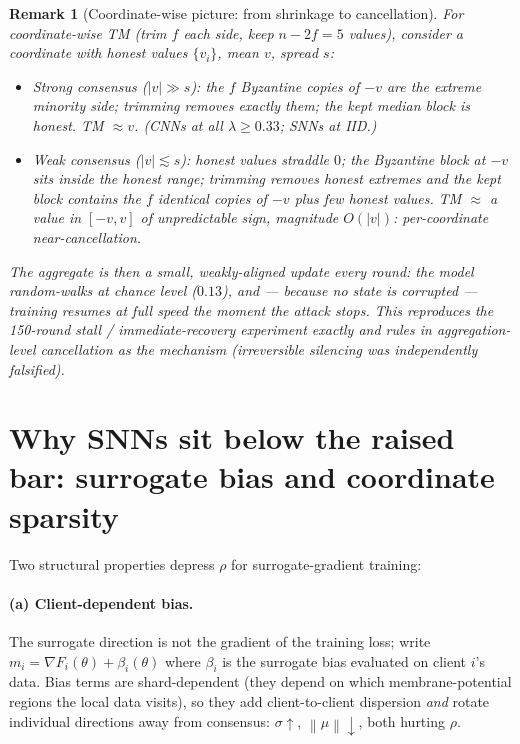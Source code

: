 \documentclass[11pt]{article}
\newtheorem{remark}{Remark}
\newcommand{\norm}[1]{\left\lVert #1 \right\rVert}
\begin{document}
\begin{remark}[Coordinate-wise picture: from shrinkage to cancellation]
For coordinate-wise TM (trim $f$ each side, keep $n-2f = 5$ values), consider a
coordinate with honest values $\{v_i\}$, mean $v$, spread $s$:
\begin{itemize}[leftmargin=2em, itemsep=0pt]
\item \emph{Strong consensus} ($|v| \gg s$): the $f$ Byzantine copies of $-v$
are the extreme minority side; trimming removes exactly them; the kept median
block is honest. TM $\approx v$. (CNNs at all $\lambda \ge 0.33$; SNNs at IID.)
\item \emph{Weak consensus} ($|v| \lesssim s$): honest values straddle $0$; the
Byzantine block at $-v$ sits \emph{inside} the honest range; trimming removes
honest extremes and the kept block contains the $f$ identical copies of $-v$
plus few honest values. TM $\approx$ a value in $[-v, v]$ of unpredictable
sign, magnitude $O(|v|)$: per-coordinate near-cancellation.
\end{itemize}
The aggregate is then a small, weakly-aligned update every round: the model
random-walks at chance level ($0.13$), and --- because no state is corrupted ---
training resumes at full speed the moment the attack stops. This reproduces the
150-round stall / immediate-recovery experiment exactly and rules in
aggregation-level cancellation as the mechanism (irreversible silencing was
independently falsified).
\end{remark}

\section{Why SNNs sit below the raised bar: surrogate bias and coordinate sparsity}

Two structural properties depress $\rho$ for surrogate-gradient training:

\paragraph{(a) Client-dependent bias.} The surrogate direction is not the
gradient of the training loss; write
$m_i = \nabla F_i(\theta) + \beta_i(\theta)$ where $\beta_i$ is the surrogate
bias evaluated on client $i$'s data. Bias terms are shard-dependent (they
depend on which membrane-potential regions the local data visits), so they add
client-to-client dispersion \emph{and} rotate individual directions away from
consensus: $\sigma \uparrow$, $\norm{\mu} \downarrow$, both hurting $\rho$.
\end{document}
